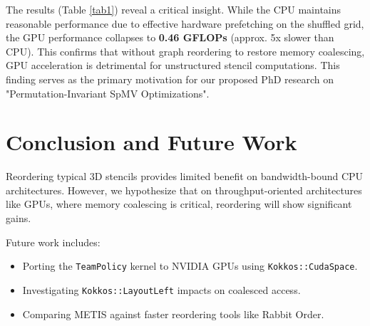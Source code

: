 \documentclass[conference]{IEEEtran}
\begin{document}
The results (Table \ref{tab1}) reveal a critical insight. While the CPU maintains reasonable performance due to effective hardware prefetching on the shuffled grid, the GPU performance collapses to \textbf{0.46 GFLOPs} (approx. 5x slower than CPU). This confirms that without graph reordering to restore memory coalescing, GPU acceleration is detrimental for unstructured stencil computations. This finding serves as the primary motivation for our proposed PhD research on "Permutation-Invariant SpMV Optimizations".

\section{Conclusion and Future Work}
Reordering typical 3D stencils provides limited benefit on bandwidth-bound CPU architectures. However, we hypothesize that on throughput-oriented architectures like GPUs, where memory coalescing is critical, reordering will show significant gains.

Future work includes:
\begin{itemize}
    \item Porting the \texttt{TeamPolicy} kernel to NVIDIA GPUs using \texttt{Kokkos::CudaSpace}.
    \item Investigating \texttt{Kokkos::LayoutLeft} impacts on coalesced access.
    \item Comparing METIS against faster reordering tools like Rabbit Order.
\end{itemize}



\end{document}
